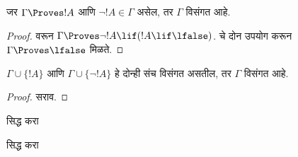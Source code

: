\documentclass[../../../include/open-logic-section]{subfiles}
\begin{document}
\begin{prop}
  जर $\Gamma \Proves !A$ आणि $\lnot !A \in \Gamma$ असेल, तर $\Gamma$
  विसंगत आहे.
\end{prop}

\begin{proof}
   वरून $\Gamma \Proves \lnot !A \lif (!A \lif \lfalse)$.
   चे दोन उपयोग करून $\Gamma \Proves \lfalse$ मिळते.
\end{proof}


\begin{prop}
  $\Gamma \cup \{!A\}$ आणि $\Gamma \cup \{\lnot !A\}$ हे दोन्ही संच
  विसंगत असतील, तर $\Gamma$ विसंगत आहे.
\end{prop}

\begin{proof}
सराव.
\end{proof}

\begin{prob}
   सिद्ध करा
\end{prob}
\tagendprob

\begin{prob}
   सिद्ध करा
\end{prob}
\tagendprob
\end{document}
